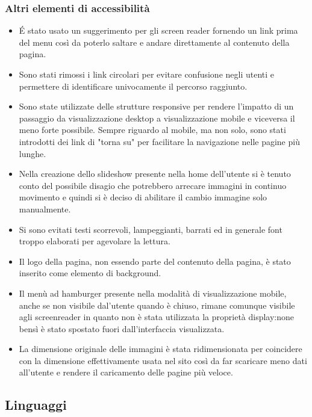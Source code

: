 \documentclass{article}
\begin{document}
			\subsubsection{Altri elementi di accessibilità}
			\begin{itemize}
				\item \'E stato usato un suggerimento per gli screen reader fornendo un link prima del menu così da poterlo saltare e andare direttamente al contenuto della pagina. 
				\item Sono stati rimossi i link circolari per evitare confusione negli utenti e permettere di identificare univocamente il percorso raggiunto.
				\item Sono state utilizzate delle strutture responsive per rendere l'impatto di un passaggio da visualizzazione desktop a visualizzazione mobile e viceversa il meno forte possibile. Sempre riguardo al mobile, ma non solo, sono stati introdotti dei link di "torna su" per facilitare la navigazione nelle pagine più lunghe.
				\item Nella creazione dello slideshow presente nella home dell'utente si è tenuto conto del possibile disagio che potrebbero arrecare immagini in continuo movimento e quindi si è deciso di abilitare il cambio immagine solo manualmente.
				\item Si sono evitati testi scorrevoli, lampeggianti, barrati ed in generale font troppo elaborati per agevolare la lettura.
				\item Il logo della pagina, non essendo parte del contenuto della pagina, è stato inserito come elemento di background.
				\item Il menù ad hamburger presente nella modalità di visualizzazione mobile, anche se non visibile dal'utente quando è chiuso, rimane comunque visibile agli screenreader in quanto non è stata utilizzata la proprietà display:none bensì è stato spostato fuori dall'interfaccia visualizzata. 
				\item La dimensione originale delle immagini è stata ridimensionata per coincidere con la dimensione effettivamente usata nel sito così da far scaricare meno dati all'utente e rendere il caricamento delle pagine più veloce.
			\end{itemize}
		
		\subsection{Linguaggi}
			
\end{document}

